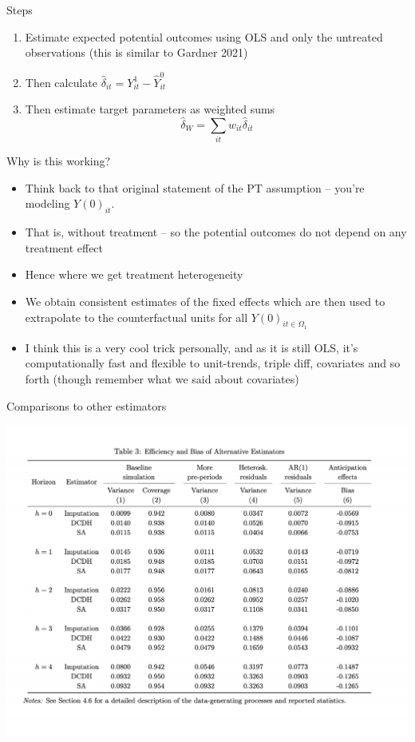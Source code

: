 \documentclass{beamer}
\begin{document}
\begin{frame}{Steps}

\begin{enumerate}
\item Estimate expected potential outcomes using OLS and only the untreated observations (this is similar to Gardner 2021)
\item Then calculate $\widehat{\delta}_{it} = Y_{it}^1 - \widehat{Y}_{it}^0$
\item Then estimate target parameters as weighted sums$$\widehat{\delta}_W = \sum_{it}w_{it}\widehat{\delta}_{it}$$
\end{enumerate}

\end{frame}


\begin{frame}{Why is this working?}

\begin{itemize}
\item Think back to that original statement of the PT assumption -- you're modeling $Y(0)_{it}$. 
\item That is, without treatment -- so the potential outcomes do not depend on any treatment effect
\item Hence where we get treatment heterogeneity
\item We obtain consistent estimates of the fixed effects which are then used to extrapolate to the counterfactual units for all $Y(0)_{it \in \Omega_1}$
\item I think this is a very cool trick personally, and as it is still OLS, it's computationally fast and flexible to unit-trends, triple diff, covariates and so forth (though remember what we said about covariates)
\end{itemize}

\end{frame}


\begin{frame}{Comparisons to other estimators}

\begin{center}
\includegraphics[scale=0.35]{./lecture_includes/bjs_sim.pdf}
\end{center}

\end{frame}
\end{document}
